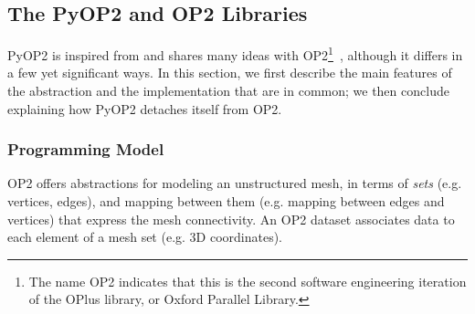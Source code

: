 \subsection{The PyOP2 and OP2 Libraries}
\label{sec:bkg:op2}
PyOP2 is inspired from and shares many ideas with OP2\footnote{The name OP2 indicates that this is the second software engineering iteration of the OPlus library, or Oxford Parallel Library.}~\cite{op2-main}, although it differs in a few yet significant ways. In this section, we first describe the main features of the abstraction and the implementation that are in common; we then conclude explaining how PyOP2 detaches itself from OP2.

\subsubsection{Programming Model}

OP2 offers abstractions for modeling an unstructured mesh, in terms of {\it sets} (e.g. vertices, edges), and mapping between them (e.g. mapping between edges and vertices) that express the mesh connectivity. An OP2 dataset associates data to each element of a mesh set (e.g. 3D coordinates).

